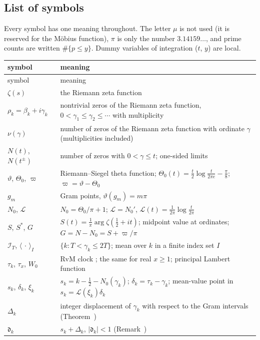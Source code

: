 \documentclass[preprint,12pt]{elsarticle}
\makeatletter
\let\CG@origref\ref
\let\CG@origeqref\eqref
\newcommand{\CG@gettip}[1]{\@ifundefined{CGTip@#1}{Reference: #1}{\csname CGTip@#1\endcsname}}
\DeclareRobustCommand{\CGref}[1]{\pdftooltip{\CG@origref{#1}}{\CG@gettip{#1}}}
\DeclareRobustCommand{\CGeqref}[1]{\pdftooltip{\CG@origeqref{#1}}{\CG@gettip{#1}}}
\numberwithin{equation}{section}
\theoremstyle{plain}
\theoremstyle{definition}
\theoremstyle{remark}
\newcommand{\NO}{N_0}
\newcommand{\lL}{\mathcal L}
\newcommand{\IT}{\mathcal I_T}
\makeatother
\begin{document}
\subsection{List of symbols}
\label{subsec:symbols}
Every symbol has one meaning throughout. The letter $\mu$ is not used (it is reserved for the M\"obius function), $\pi$ is only the number $3.14159\ldots$, and prime counts are written $\#\{p\le y\}$. Dummy variables of integration ($t$, $y$) are local.

\begin{center}
\small
\begin{longtable}{p{}p{}}
\toprule
symbol & meaning\\
\midrule
\endfirsthead
\toprule
symbol & meaning\\
\midrule
\endhead
\bottomrule
\endfoot
$\zeta(s)$ & the Riemann zeta function\\
$\rho_k=\beta_k+i\gamma_k$ & nontrivial zeros of the Riemann zeta function, $0<\gamma_1\le\gamma_2\le\cdots$ with multiplicity\\
$\nu(\gamma)$ & number of zeros of the Riemann zeta function with ordinate $\gamma$ (multiplicities included)\\
$N(t)$, $N(t^\pm)$ & number of zeros with $0<\gamma\le t$; one-sided limits\\
$\vartheta$, $\Theta_0$, $\varpi$ & Riemann--Siegel theta function; $\Theta_0(t)=\frac t2\log\frac t{2\pi e}-\frac\pi8$; $\varpi=\vartheta-\Theta_0$\\
$g_m$ & Gram points, $\vartheta(g_m)=m\pi$\\
$\NO$, $\lL$ & $\NO=\Theta_0/\pi+1$; $\lL=\NO'$, $\lL(t)=\frac1{2\pi}\log\frac t{2\pi}$\\
$S$, $S^*$, $G$ & $S(t)=\frac1\pi\arg\zeta(\frac12+it)$; midpoint value at ordinates; $G=N-\NO=S+\varpi/\pi$\\
$\IT$, $\langle\,\cdot\,\rangle_I$ & $\{k:T<\gamma_k\le2T\}$; mean over $k$ in a finite index set $I$\\
$\tau_k$, $\tau_x$, $W_0$ & RvM clock \CGeqref{eq:clock}; the same for real $x\ge1$; principal Lambert function\\
$s_k$, $\delta_k$, $\xi_k$ & $s_k=k-\frac12-\NO(\gamma_k)$; $\delta_k=\tau_k-\gamma_k$; mean-value point in $s_k=\lL(\xi_k)\delta_k$\\
$\Delta_k$ & integer displacement of $\gamma_k$ with respect to the Gram intervals (Theorem~\CGref{thm:known_korolev})\\
$\mathfrak d_k$ & $s_k+\Delta_k$, $|\mathfrak d_k|<1$ (Remark~\CGref{rem:korolev})\\

\end{longtable}
\end{center}
\end{document}

